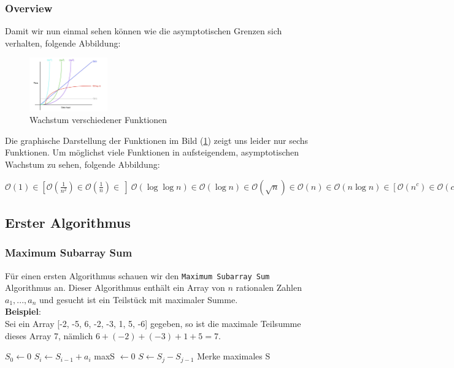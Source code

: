 \documentclass[a4paper]{article}
\begin{document}
    \subsubsection{Overview}
    Damit wir nun einmal sehen können wie die asymptotischen Grenzen sich verhalten, folgende Abbildung: 
    \begin{figure}[h]
        \centering
        \includegraphics[width=0.3\textwidth]{Pictures/big-o-notation.jpg}
        \caption{Wachstum verschiedener Funktionen}
        \label{fig: WachstumBigO}
    \end{figure}
    Die graphische Darstellung der Funktionen im Bild (\ref{fig: WachstumBigO}) zeigt uns leider nur sechs Funktionen. 
    Um möglichst viele Funktionen in aufsteigendem, asymptotischen Wachstum zu sehen, folgende Abbildung:

    $\mathcal{O}(1) \in [\mathcal{O}(\frac{1}{n^2}) \in \mathcal{O}(\frac{1}{n}) \in \ ] \  \mathcal{O}(\log \log n)\in \mathcal{O}(\log n) \in \mathcal{O}(\sqrt{n}) \in \mathcal{O}(n) \in \mathcal{O}(n\log n) \in [\mathcal{O}({n^c}) \in \mathcal{O}(c^n) \in \ ] \mathcal{O}(n^2) \in \mathcal{O}(2^n) \in \mathcal{O}(2^{n^{2}}) \in \mathcal{O}(n!) $

\newpage
\subsection{Erster Algorithmus} 
    \subsubsection{Maximum Subarray Sum}\label{MSS-Abschnitt}
    Für einen ersten Algorithmus schauen wir den \texttt{Maximum Subarray Sum} Algorithmus an. Dieser Algorithmus enthält ein Array von $n$ rationalen Zahlen $a_1,..., a_n$ und gesucht ist ein Teilstück mit maximaler Summe.  \\
    \textbf{Beispiel}: \\
    Sei ein Array [-2, -5, 6, -2, -3, 1, 5, -6] gegeben, so ist die maximale Teilsumme dieses Array 7, nämlich $ 6 + (-2) + (-3) + 1 + 5 = 7$. \\
      
\begin{algorithm}
    \caption{Maximum Subarray Sum $(a_1,..., a_n)$}
    \label{alg:MSS-1}
    \begin{algorithmic}[1]
    \State $S_0 \gets 0$ 
        \State $S_i \gets S_{i-1} + a_i$ 
    \EndFor
    \State maxS $\gets 0$
            \State $S \gets S_j - S_{j-1}$ 
           \State Merke maximales S
        \EndFor
    \EndFor
    \EndFunction

    \end{algorithmic}
    
\end{algorithm}
\end{document}
